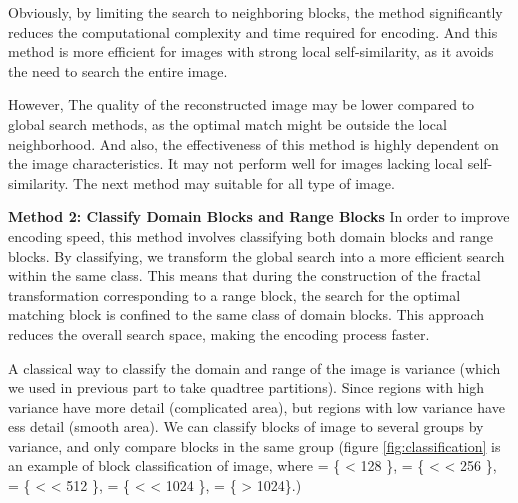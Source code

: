 \documentclass[a4paper,11pt, titlepage]{article}
\theoremstyle{definition}
\theoremstyle{plain}
\theoremstyle{remark}
\theoremstyle{definition}
\begin{document}
 Obviously, by limiting the search to neighboring blocks, the method significantly reduces the computational complexity and time required for encoding. And this method is more efficient for images with strong local self-similarity, as it avoids the need to search the entire image.

However, The quality of the reconstructed image may be lower compared to global search methods, as the optimal match might be outside the local neighborhood. And also, the effectiveness of this method is highly dependent on the image characteristics. It may not perform well for images lacking local self-similarity. The next method may suitable for all type of image.

\textbf{Method 2: Classify Domain Blocks and Range Blocks}
In order to improve encoding speed, this method involves classifying both domain blocks and range blocks. By classifying, we transform the global search into a more efficient search within the same class. This means that during the construction of the fractal transformation corresponding to a range block, the search for the optimal matching block is confined to the same class of domain blocks. This approach reduces the overall search space, making the encoding process faster.

A classical way to classify the domain and range of the image is variance (which we used in previous part to take quadtree partitions).
Since regions with high variance have more detail (complicated area), but regions with low variance have ess detail (smooth area).
We can classify blocks of image to several groups by variance, and only compare blocks in the same group (figure \ref{fig:classification} is an example of block classification of image, where   = \{  \mid {} < 128 \},  = \{   <  < 256 \},   = \{   <  < 512 \},   = \{   <  < 1024 \},   = \{  \mid {} > 1024\}.) 
\end{document}
